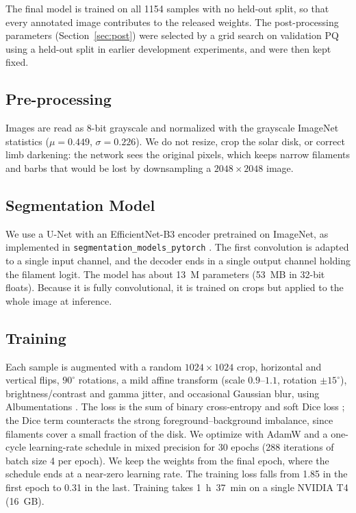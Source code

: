 \documentclass[sigconf]{acmart}
\begin{document}
    The final model is trained on all 1154 samples with no held-out split, so that every annotated image contributes to the released weights. The post-processing parameters (Section~\ref{sec:post}) were selected by a grid search on validation PQ using a held-out split in earlier development experiments, and were then kept fixed.

\subsection{Pre-processing}
    Images are read as 8-bit grayscale and normalized with the grayscale ImageNet statistics ($\mu=0.449$, $\sigma=0.226$). We do not resize, crop the solar disk, or correct limb darkening: the network sees the original pixels, which keeps narrow filaments and barbs that would be lost by downsampling a $2048\times2048$ image.

\subsection{Segmentation Model}
    We use a U-Net \cite{ronneberger2015unet} with an EfficientNet-B3 encoder \cite{tan2019efficientnet} pretrained on ImageNet, as implemented in \texttt{segmentation\_models\_pytorch} \cite{iakubovskii2019smp}. The first convolution is adapted to a single input channel, and the decoder ends in a single output channel holding the filament logit. The model has about 13~M parameters (53~MB in 32-bit floats). Because it is fully convolutional, it is trained on crops but applied to the whole image at inference.

\subsection{Training}
    Each sample is augmented with a random $1024\times1024$ crop, horizontal and vertical flips, $90^\circ$ rotations, a mild affine transform (scale $0.9$--$1.1$, rotation $\pm15^\circ$), brightness/contrast and gamma jitter, and occasional Gaussian blur, using Albumentations \cite{buslaev2020albumentations}. The loss is the sum of binary cross-entropy and soft Dice loss \cite{milletari2016vnet}; the Dice term counteracts the strong foreground--background imbalance, since filaments cover a small fraction of the disk. We optimize with AdamW \cite{loshchilov2019adamw} and a one-cycle learning-rate schedule \cite{smith2019superconvergence} in mixed precision for 30 epochs (288 iterations of batch size 4 per epoch). We keep the weights from the final epoch, where the schedule ends at a near-zero learning rate. The training loss falls from 1.85 in the first epoch to 0.31 in the last. Training takes 1~h~37~min on a single NVIDIA T4 (16~GB).
\end{document}
